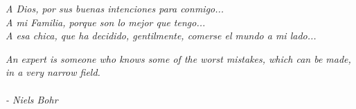 
{\it A Dios, por sus buenas intenciones para conmigo...} \\[2mm]
{\it A mi Familia, porque son lo mejor que tengo...} \\[2mm]
{\it A esa chica, que ha decidido, gentilmente, comerse el mundo a mi lado...} \\[10mm]

\vfill

\noindent\hfill 
\begin{minipage}{0.4\textwidth}
{\it An expert is someone who knows some of the worst mistakes, which can be made, in a very narrow field.} \\ \\
{\it - Niels Bohr}
\end{minipage} 